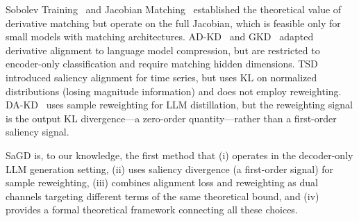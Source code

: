 Sobolev Training~\citep{czarnecki2017sobolev} and Jacobian Matching~\citep{srinivas2018knowledge} established the theoretical value of derivative matching but operate on the full Jacobian, which is feasible only for small models with matching architectures.
AD-KD~\citep{wu-etal-2023-ad} and GKD~\citep{wang2022gkd} adapted derivative alignment to language model compression, but are restricted to encoder-only classification and require matching hidden dimensions.
TSD~\citep{dehigahawattage2026learning} introduced saliency alignment for time series, but uses KL on normalized distributions (losing magnitude information) and does not employ reweighting.
DA-KD~\citep{dakd2025} uses sample reweighting for LLM distillation, but the reweighting signal is the output KL divergence---a zero-order quantity---rather than a first-order saliency signal.

SaGD is, to our knowledge, the first method that (i) operates in the decoder-only LLM generation setting, (ii) uses saliency divergence (a first-order signal) for sample reweighting, (iii) combines alignment loss and reweighting as dual channels targeting different terms of the same theoretical bound, and (iv) provides a formal theoretical framework connecting all these choices.

